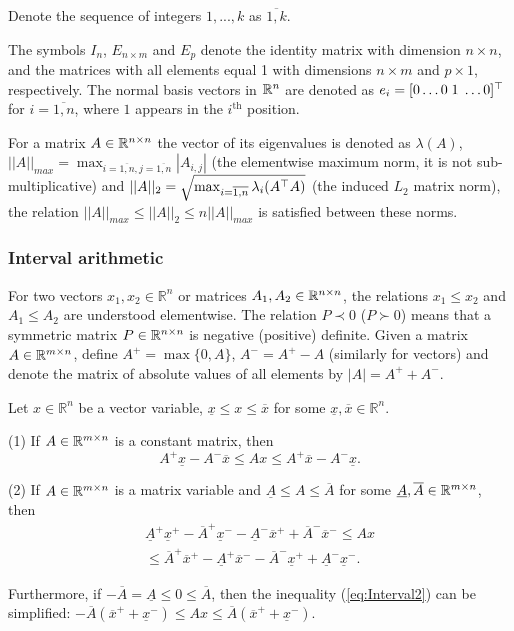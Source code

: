Denote the sequence of integers $1,...,k$ as $\overline{1,k}$. 

The symbols $I_{n}$, $E_{n\times m}$ and $E_{p}$ denote the identity matrix with dimension $n\times n$, and the matrices with all elements equal 1 with dimensions $n\times m$ and $p\times1$, respectively. The normal basis vectors in $\mathbb{R}^{n}$ are denoted as $e_{i}=[0\dots0\;1\;\dots0]^{\top}$ for $i=\overline{1,n}$, where $1$ appears in the $i^{\text{th}}$ position.

For a matrix $A\in\mathbb{R}^{n\times n}$ the vector of its eigenvalues is denoted as $\lambda(A)$, $||A||_{max}=\max_{i=\overline{1,n},j=\overline{1,n}}|A_{i,j}|$ (the elementwise maximum norm, it is not sub-multiplicative) and $||A||_{2}=\sqrt{\max_{i=\overline{1,n}}\lambda_{i}(A^{\top} A)}$ (the induced $L_{2}$ matrix norm), the relation $||A||_{max}\le||A||_{2}\le n||A||_{max}$ is satisfied between these norms.

\subsubsection{Interval arithmetic}

For two vectors $x_{1},x_{2}\in\mathbb{R}^{n}$ or matrices $A_{1},A_{2}\in\mathbb{R}^{n\times n}$, the relations $x_{1}\le x_{2}$ and $A_{1}\le A_{2}$ are understood elementwise. The relation $P\prec0$ ($P\succ0$) means that a symmetric matrix $P\in\mathbb{R}^{n\times n}$ is negative (positive) definite. Given a matrix $A\in\mathbb{R}^{m\times n}$, define $A^{+}=\max\{0,A\}$, $A^{-}=A^{+}-A$ (similarly for vectors) and denote the matrix of absolute values of all elements by $|A|=A^{+}+A^{-}$. 
\begin{lemma}
	\textup{\cite{EFRZS12}} \label{lem:interval} Let $x\in\mathbb{R}^{n}$ be a vector variable, $\underline{x}\le x\le\overline{x}$ for some $\underline{x},\overline{x}\in\mathbb{R}^{n}$. 
	
	\textup{(1)} If $A\in\mathbb{R}^{m\times n}$ is a constant matrix, then
	\begin{equation}
	A^{+}\underline{x}-A^{-}\overline{x}\le Ax\le A^{+}\overline{x}-A^{-}\underline{x}.\label{eq:Interval1}
	\end{equation}
	
	\textup{(2)} If $A\in\mathbb{R}^{m\times n}$ is a matrix variable and \textup{$\underline{A}\le A\le\overline{A}$} for some $\underline{A},\overline{A}\in\mathbb{R}^{m\times n}$, then
	\begin{gather}
	\underline{A}^{+}\underline{x}^{+}-\overline{A}^{+}\underline{x}^{-}-\underline{A}^{-}\overline{x}^{+}+\overline{A}^{-}\overline{x}^{-}\leq Ax\label{eq:Interval2}\\
	\leq\overline{A}^{+}\overline{x}^{+}-\underline{A}^{+}\overline{x}^{-}-\overline{A}^{-}\underline{x}^{+}+\underline{A}^{-}\underline{x}^{-}.\nonumber 
	\end{gather}
\end{lemma}
Furthermore, if $-\overline{A}=\underline{A}\le0\le\overline{A}$, then the inequality (\ref{eq:Interval2}) can be simplified: $-\overline{A}(\overline{x}^{+}+\underline{x}^{-})\leq Ax\leq\overline{A}(\overline{x}^{+}+\underline{x}^{-})$.

